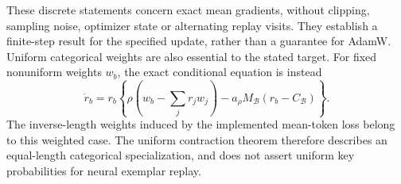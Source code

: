 These discrete statements concern exact mean gradients, without clipping,
sampling noise, optimizer state or alternating replay visits. They establish
a finite-step result for the specified update, rather than a guarantee for
AdamW. Uniform categorical weights are also essential to the stated target.
For fixed nonuniform weights $w_b$, the exact conditional equation is instead
\begin{equation}
 \dot r_b=r_b\left\{
   \rho\left(w_b-\sum_jr_jw_j\right)
   -a_\rho M_{\mathcal B}(r_b-C_{\mathcal B})\right\}.
 \label{eq:replay-finite-weighted}
\end{equation}
The inverse-length weights induced by the implemented mean-token loss belong
to this weighted case. The uniform contraction theorem therefore describes
an equal-length categorical specialization, and does not assert uniform key
probabilities for neural exemplar replay.
